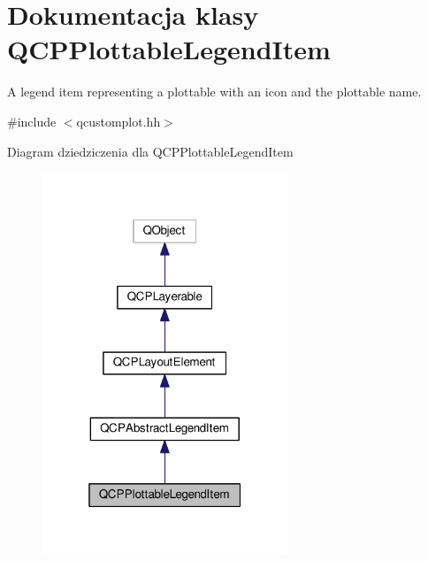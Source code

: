 \hypertarget{class_q_c_p_plottable_legend_item}{}\section{Dokumentacja klasy Q\+C\+P\+Plottable\+Legend\+Item}
\label{class_q_c_p_plottable_legend_item}


A legend item representing a plottable with an icon and the plottable name.  




{\ttfamily \#include $<$qcustomplot.\+hh$>$}



Diagram dziedziczenia dla Q\+C\+P\+Plottable\+Legend\+Item\nopagebreak
\begin{figure}[H]
\begin{center}
\leavevmode
\includegraphics[width=208pt]{class_q_c_p_plottable_legend_item__inherit__graph}
\end{center}
\end{figure}


